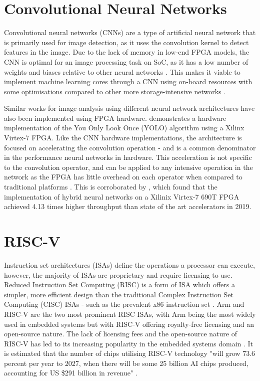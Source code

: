 \section{Convolutional Neural Networks}
Convolutional neural networks (CNNs) are a type of artificial neural network that is primarily used for image detection, as it uses the convolution kernel to detect features in the image.
Due to the lack of memory in low-end FPGA models, the CNN is optimal for an image processing task on SoC, as it has a low number of weights and biases relative to other neural networks \cite{Drowsiness}.
This makes it viable to implement machine learning cores through a CNN using on-board resources with some optimisations compared to other more storage-intensive networks \cite{14}.

Similar works for image-analysis using different neural network architectures have also been implemented using FPGA hardware.
\cite{Yolo, SparseYolo} demonstrates a hardware implementation of the You Only Look Once (YOLO) algorithm using a Xilinx Virtex-7 FPGA. 
Like the CNN hardware implementations, the architecture is focused on accelerating the convolution operation - and is a common denominator in the performance neural networks in hardware.
This acceleration is not specific to the convolution operator, and can be applied to any intensive operation in the network as the FPGA has little overhead on each operator when compared to traditional platforms \cite{Overhead}.
This is corroborated by \cite{Throughput}, which found that the implementation of hybrid neural networks on a Xilinix Virtex-7 690T FPGA achieved 4.13 times higher throughput than state of the art accelerators in 2019.


\section{RISC-V}
Instruction set architectures (ISAs) define the operations a processor can execute, however, the majority of ISAs are proprietary and require licensing to use.
Reduced Instruction Set Computing (RISC) is a form of ISA which offers a simpler, more efficient design than the traditional Complex Instruction Set Computing (CISC) ISAs - such as the prevalent x86 instruction set \cite{Arm}.
Arm and RISC-V are the two most prominent RISC ISAs, with Arm being the most widely used in embedded systems but with RISC-V offering royalty-free licensing and an open-source nature.
The lack of licensing fees and the open-source nature of RISC-V has led to its increasing popularity in the embedded systems domain \cite{Neutron}.
It is estimated that the number of chips utilising RISC-V technology "will grow 73.6 percent per year to 2027, when there will be some 25 billion AI chips produced, accounting for US \$291 billion in revenue" \cite{Drowsiness}.



